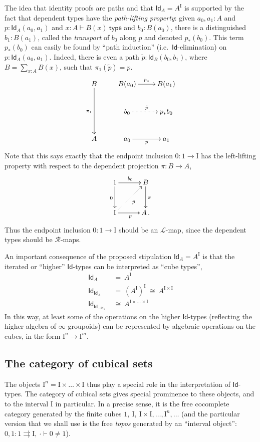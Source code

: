 \documentclass[12pt]{article}
\renewcommand{\L}{\ensuremath{\mathcal{L}}}
\newcommand{\R}{\ensuremath{\mathcal{R}}}
\newcommand{\I}{\ensuremath{\mathrm{I}}}
\newcommand{\type}{\mathsf{type}}
\newcommand{\types}[2]{#1 \vdash #2\ \type}
\newcommand{\Id}{\ensuremath{\mathsf{Id}}}
\newcommand{\id}[1]{\Id_{#1}}
\theoremstyle{remark}
\theoremstyle{definition}
\begin{document}
The idea that identity proofs are paths and that $\id{A} = A^\I$ is supported by the fact that dependent types have the \emph{path-lifting property}: given $a_0,a_1:A$  and $p:\id{A}(a_0,a_1)$ and $\types{x:A}{B(x)}$  and $b_0:B(a_0)$, there is a distinguished $b_1:B(a_1)$, called the \emph{transport} of $b_0$ along $p$ and denoted $p_*(b_0)$.  This term $p_*(b_0)$ can easily be found by ``path induction'' (i.e.\ \Id-elimination) on $p:\id{A}(a_0,a_1)$.
Indeed, there is even a path $\tilde{p} : \id{B}(b_0,b_1)$, where $B=\sum_{x:A}B(x)$, such that $\pi_1(\tilde{p})=p$.
\[
\xymatrix{
B \ar[dd]_{\pi_1} & B(a_0) \ar[r]^{p_*} & B(a_1) \\
   	& b_0 \ar@{..>}[r]^{\tilde{p} } & p_*b_0  \\
A  	&	a_0 \ar[r]_{p} &  a_1
}
\]
%
Note that this says exactly that the endpoint inclusion $0 : 1\to \I$ has the left-lifting property with respect to the dependent projection $\pi:B\to A$,
\[
\xymatrix@=3em{
1 \ar[d]_{0} \ar[r]^{b_0} & B \ar[d]^{\pi} \\
\I \ar[r]_{p} \ar@{..>}[ru]_{\tilde{p}} & A\,.
}
\]
Thus the endpoint inclusion $0 : 1\to \I$ should be an $\L$-map, since the dependent types should be $\R$-maps.

An important consequence of the proposed stipulation $\id{A} = A^\I$ is that the iterated or ``higher'' \Id-types can be interpreted as ``cube types'',
\begin{align*}
\id{A}\ &=\ A^\I \\
\id{\id{A}}\ &=\ (A^\I)^\I\ \cong\ A^{\I\times\I} \\
\id{\id{\dots\id{A}}}\ &\cong\ A^{\I\times\dots\times\I}
\end{align*}
%
In this way, at least some of the operations on the higher \Id-types (reflecting the higher algebra of $\infty$-groupoids) can be represented by algebraic operations on the cubes, in the form $\I^n \to \I^m$.

\subsection{The category of cubical sets}

The objects $\I^n = \I\times \dots\times \I$ thus play a special role in the  interpretation of \Id-types.  The category of cubical sets gives special prominence to these objects, and to the interval $\I$ in particular.  In a precise sense, it is the free cocomplete category generated by the finite cubes $1,\ \I,\ \I\times\I, \dots, \I^n, \dots$ (and the particular version that we shall use is the free \emph{topos} generated by an ``interval object'': $0,1 : 1\rightrightarrows \I,\ \cdot\vdash 0\neq 1$).
\end{document}
